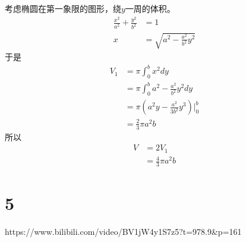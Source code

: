 \documentclass{article}
\begin{document}
\begin{itemize}
        考虑椭圆在第一象限的图形，绕$y$一周的体积。
        \begin{align*}
          \frac{x^2}{a^2} + \frac{y^2}{b^2} & = 1                               \\
          x                                 & = \sqrt{a^2 - \frac{a^2}{b^2}y^2}
        \end{align*}
        于是
        \begin{align*}
          V_1 & = \pi \int_{0}^{b} x^2 dy                           \\
              & = \pi \int_{0}^{b} a^2 - \frac{a^2}{b^2}y^2 dy      \\
              & = \pi (a^2 y - \frac{a^2}{3b^2} y^3) \bigg|_{0}^{b} \\
              & = \frac{2}{3}\pi a^2 b
        \end{align*}
        所以
        \begin{align*}
          V & = 2 V_1                \\
            & = \frac{4}{3}\pi a^2 b
        \end{align*}
\end{itemize}

\section*{5}

https://www.bilibili.com/video/BV1jW4y1S7z5?t=978.9\&p=161
\end{document}
